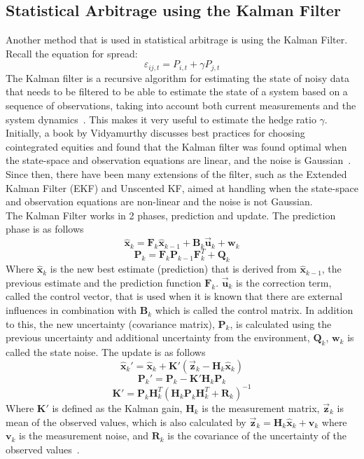 \subsection{Statistical Arbitrage using the Kalman Filter}
Another method that is used in statistical arbitrage is using the Kalman Filter. Recall the equation for spread:
$$\varepsilon_{i j,t} = P_{i,t} + \gamma P_{j,t}$$
\noindent The Kalman filter is a recursive algorithm for estimating the state of noisy data that needs to be filtered to be able to estimate the state of a system based on a sequence of observations, taking into account both current measurements and the system dynamics~\cite{ALSADIK2019299}. This makes it very useful to estimate the hedge ratio $\gamma$. Initially, a book by Vidyamurthy discusses best practices for choosing cointegrated equities and found that the Kalman filter was found optimal when the state-space and observation equations are linear, and the noise is Gaussian~\cite{vidyamurthy2004pairs}. Since then, there have been many extensions of the filter, such as the Extended Kalman Filter (EKF) and Unscented KF, aimed at handling when the state-space and observation equations are non-linear and the noise is not Gaussian.
\\[3mm]
The Kalman Filter works in 2 phases, prediction and update. The prediction phase is as follows $$\hat{\mathbf{x}}_k = \mathbf{F}_k \hat{\mathbf{x}}_{k-1} + \mathbf{B}_k \overset{\rightarrow}{\mathbf{u}}_k + \mathbf{w}_k$$ $$\mathbf{P}_k = \mathbf{F}_k \mathbf{P}_{k-1} \mathbf{F}_k^T + \mathbf{Q}_k $$ Where $\hat{\mathbf{x}}_k$ is the new best estimate (prediction) that is derived from $\hat{\mathbf{x}}_{k-1}$, the previous estimate and the prediction function $\mathbf{F}_k$. $\overset{\rightarrow}{\mathbf{u}}_k$ is the correction term, called the control vector, that is used when it is known that there are external influences in combination with $\mathbf{B}_k$ which is called the control matrix. In addition to this, the new uncertainty (covariance matrix), $\mathbf{P}_k$, is calculated using the previous uncertainty and additional uncertainty from the environment, $\mathbf{Q}_k $, $\mathbf{w}_k$ is called the state noise. The update is as follows $$\hat{\mathbf{x}}_k' = \hat{\mathbf{x}}_k + \mathbf{K}'(\overset{\rightarrow}{\mathbf{z}}_k - \mathbf{H}_k \hat{\mathbf{x}}_k)$$ $$\mathbf{P}_k' = \mathbf{P}_k - \mathbf{K}'\mathbf{H}_k \mathbf{P}_k$$ $$\mathbf{K}' = \mathbf{P}_k \mathbf{H}_k^T (\mathbf{H}_k \mathbf{P}_k \mathbf{H}_k^T + \mathbf{R}_k)^{-1}$$ Where $\mathbf{K}'$ is defined as the Kalman gain, $\mathbf{H}_k$ is the measurement matrix, $\overset{\rightarrow}{\mathbf{z}}_k$ is mean of the observed values, which is also calculated by $\overset{\rightarrow}{\mathbf{z}}_k = \mathbf{H}_k \hat{\mathbf{x}}_k + \mathbf{v}_k$ where $\mathbf{v}_k$ is the measurement noise, and $\mathbf{R}_k$ is the covariance of the uncertainty of the observed values~\cite{kalman_filter_bzarg}.
